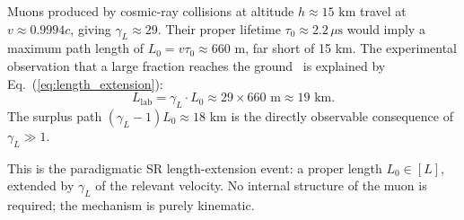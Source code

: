 \documentclass[%
 reprint, amsmath,amssymb, aps, prb, ]{revtex4-2}
\numberwithin{equation}{section}
\newcommand{\gammaL}{\gamma_{L}}
\begin{document}
Muons produced by cosmic-ray collisions at altitude $h \approx 15\text{ km}$ travel at $v \approx 0.9994c$, giving $\gammaL \approx 29$. Their proper lifetime $\tau_0 \approx 2.2\,\mu\text{s}$ would imply a maximum path length of $L_0 = v\tau_0 \approx 660\text{ m}$, far short of 15 km. The experimental observation that a large fraction reaches the ground~\cite{Bailey1977} is explained by Eq.~(\ref{eq:length_extension}):
\begin{equation}
L_{\text{lab}} = \gammaL \cdot L_0 \approx 29 \times 660\text{ m} \approx 19\text{ km}.
\label{eq:muon_path}
\end{equation}
The surplus path $(\gammaL - 1)L_0 \approx 18\text{ km}$ is the directly observable consequence of $\gammaL \gg 1$.

This is the paradigmatic SR length-extension event: a proper length $L_0 \in [L]$, extended by $\gammaL$ of the relevant velocity. No internal structure of the muon is required; the mechanism is purely kinematic.
\end{document}
